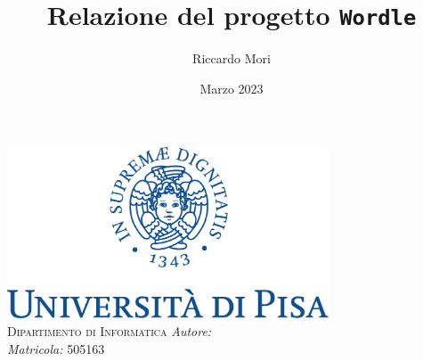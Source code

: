 \documentclass{article}
\title{Relazione del progetto \texttt{Wordle}}
\author{Riccardo Mori}
\date{Marzo 2023}
\begin{document}
	
	\begin{titlepage}
		\centering
		\includegraphics[height=12pc]{img/marchio_unipi.pdf} \\
		\null
		\textsc{\huge Dipartimento di Informatica}
		\vfill
		{\huge{\@title}}
		\vfill
		\emph{Autore:} \@author \\
		\emph{Matricola:} 505163 \\
		\@date
	\end{titlepage}
	
	\tableofcontents
	\pagebreak
	
	
	
	
	
	
	
	
	\newpage
	
	\appendix
	
	\newpage
	
	
\end{document}
